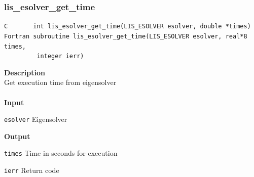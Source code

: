 \documentclass[a4paper]{article}
\newcommand{\namelistlabel}[1]{\mbox{#1}\hfill}
\newenvironment{namelist}[1]{%
 \begin{list}{}
  {\let\makelabel\namelistlabel
  \settowidth{\labelwidth}{#1}
  \setlength{\leftmargin}{1.1\labelwidth}}
}{%
\end{list}}
\begin{document}
  \subsubsection{lis\_esolver\_get\_time}
\begin{screen}
\verb|C       int lis_esolver_get_time(LIS_ESOLVER esolver, double *times)|\\
\verb|Fortran subroutine lis_esolver_get_time(LIS_ESOLVER esolver, real*8 times,|\\
\verb|         integer ierr)|
\end{screen}
{\bf Description}\\
\indent
Get execution time from eigensolver
\\ \\
\noindent
{\bf Input}
\begin{namelist}{XXXXXXXXXXXXXXXXXXXX}
\item[\tt esolver] Eigensolver
\end{namelist}
{\bf Output}
\begin{namelist}{XXXXXXXXXXXXXXXXXXXX}
\item[\tt times] Time in seconds for execution
\item[\tt ierr] Return code
\end{namelist}
\newpage
\end{document}
